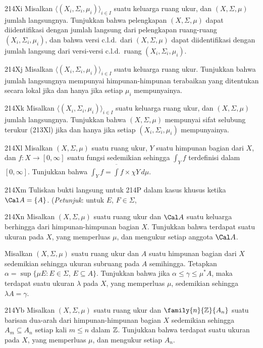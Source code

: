 {\sqheader 214Xi Misalkan
$\langle(X_i,\Sigma_i,\mu_i)\rangle_{i\in I}$ suatu keluarga ruang ukur,
dan $(X,\Sigma,\mu)$ jumlah langsungnya.   Tunjukkan bahwa pelengkapan
$(X,\Sigma,\mu)$ dapat diidentifikasi dengan jumlah langsung dari
pelengkapan ruang-ruang $(X_i,\Sigma_i,\mu_i)$, dan bahwa versi c.l.d.\
dari $(X,\Sigma,\mu)$ dapat diidentifikasi dengan jumlah langsung dari
versi-versi c.l.d.\ ruang $(X_i,\Sigma_i,\mu_i)$.

\spheader 214Xj Misalkan
$\langle(X_i,\Sigma_i,\mu_i)\rangle_{i\in I}$ suatu keluarga ruang ukur.
Tunjukkan bahwa jumlah langsungnya mempunyai himpunan-himpunan terabaikan
yang ditentukan secara lokal jika dan hanya jika setiap $\mu_i$
mempunyainya.

\spheader 214Xk
Misalkan $\langle(X_i,\Sigma_i,\mu_i)\rangle_{i\in I}$ suatu keluarga
ruang ukur, dan $(X,\Sigma,\mu)$ jumlah langsungnya.   Tunjukkan bahwa
$(X,\Sigma,\mu)$ mempunyai sifat selubung terukur (213Xl) jika dan hanya
jika setiap $(X_i,\Sigma_i,\mu_i)$ mempunyainya.

\spheader 214Xl
Misalkan $(X,\Sigma,\mu)$ suatu ruang ukur, $Y$ suatu himpunan bagian dari
$X$, dan $f:X\to[0,\infty]$ suatu fungsi sedemikian sehingga $\int_Yf$
terdefinisi dalam $[0,\infty]$. Tunjukkan bahwa
$\int_Yf=\overline{\int}f\times\chi Y\,d\mu$.

\sqheader 214Xm
Tuliskan bukti langsung untuk 214P dalam kasus khusus ketika
$\Cal A=\{A\}$.   ({\it Petunjuk\/}: untuk $E$, $F\in\Sigma$,


\sqheader 214Xn
Misalkan $(X,\Sigma,\mu)$ suatu ruang ukur dan $\Cal A$ suatu keluarga
berhingga dari himpunan-himpunan bagian $X$.   Tunjukkan bahwa terdapat
suatu ukuran pada $X$, yang memperluas $\mu$, dan mengukur setiap anggota
$\Cal A$.

Misalkan $(X,\Sigma,\mu)$ suatu ruang ukur dan $A$ suatu himpunan bagian
dari $X$ sedemikian sehingga ukuran subruang pada $A$ semihingga.
Tetapkan $\alpha=\sup\{\mu E:E\in\Sigma$, $E\subseteq A\}$.
Tunjukkan bahwa jika $\alpha\le\gamma\le\mu^*A$, maka terdapat suatu
ukuran $\lambda$ pada $X$, yang memperluas $\mu$, sedemikian sehingga
$\lambda A=\gamma$.

\spheader 214Yb
Misalkan $(X,\Sigma,\mu)$ suatu ruang ukur dan
$\family{n}{\Bbb Z}{A_n}$ suatu barisan dua-arah dari himpunan-himpunan
bagian $X$ sedemikian sehingga $A_m\subseteq A_n$ setiap kali $m\le n$
dalam $\Bbb Z$.   Tunjukkan bahwa terdapat suatu ukuran pada $X$, yang
memperluas $\mu$, dan mengukur setiap $A_n$.

}
